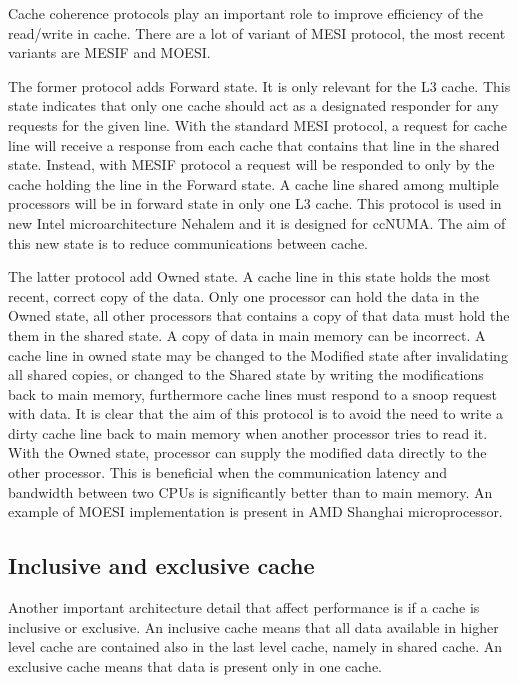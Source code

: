 Cache coherence protocols play an important role to improve efficiency of the read/write in cache. There are a lot of variant of MESI protocol, the most 
recent variants are MESIF and MOESI.

The former protocol adds Forward state. It is only relevant for the L3 cache. This state indicates that only one cache should act as a designated responder 
for any requests for the given line. With the standard MESI protocol, a request for cache line will receive a response from each cache that contains that 
line in the shared state. Instead, with MESIF protocol a request will be responded to only by the cache holding the line in the Forward state.
A cache line shared among multiple processors will be in forward state in only one L3 cache. This protocol is used in new Intel microarchitecture Nehalem 
and it is designed for ccNUMA. The aim of this new state is to reduce communications between cache.

The latter protocol add Owned state. A cache line in this state holds the most recent, correct copy of the data. Only one processor can hold the data 
in the Owned state, all other processors that contains a copy of that data must hold the them in the shared state. A copy of data in main memory can be 
incorrect. A cache line in owned state may be changed to the Modified state after invalidating all shared copies, or changed to the Shared state by 
writing the modifications back to main memory, furthermore cache lines must respond to a snoop request with data. 
It is clear that the aim of this protocol is to avoid the need to write a dirty cache line back to main memory when another processor tries to read it. 
With the Owned state, processor can supply the modified data directly to the other processor. This is beneficial when the communication latency and 
bandwidth between two CPUs is significantly better than to main memory. An example of MOESI implementation is present in AMD Shanghai microprocessor.

\subsection{Inclusive and exclusive cache}

Another important architecture detail that affect performance is if a cache is inclusive or exclusive.
An inclusive cache means that all data available in higher level cache are contained also in the last level cache, namely in shared cache.
An exclusive cache means that data is present only in one cache.


